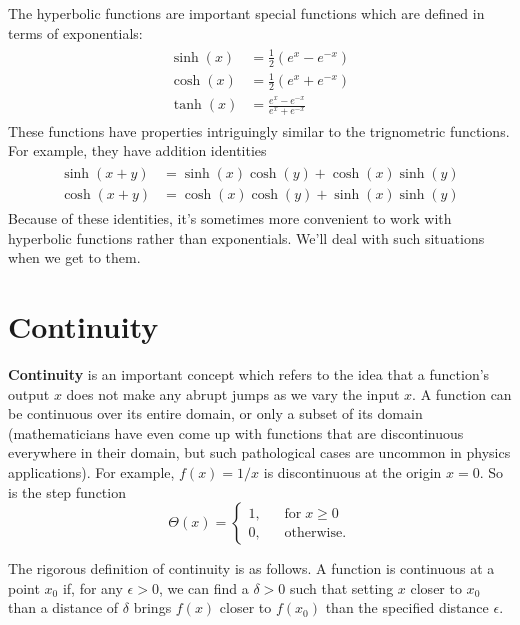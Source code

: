 \documentclass[10pt,a4paper]{article}
\begin{document}
The hyperbolic functions are important special functions which are
defined in terms of exponentials:
\begin{align}
\begin{aligned}\sinh(x) &= \frac{1}{2}\left(e^{x} - e^{-x}\right) \\ \cosh(x) &= \frac{1}{2}\left(e^{x} + e^{-x}\right) \\ \tanh(x) &= \frac{e^{x} - e^{-x}}{e^{x} + e^{-x}}\end{aligned}
\end{align}
These functions have properties intriguingly similar to the trignometric
functions. For example, they have addition identities
\begin{align}
  \begin{aligned}\sinh(x+y) &= \sinh(x)\cosh(y) + \cosh(x)\sinh(y) \\
\cosh(x+y) &= \cosh(x)\cosh(y) + \sinh(x)\sinh(y)\end{aligned}
\end{align}
Because of these identities, it's sometimes more convenient to work with
hyperbolic functions rather than exponentials. We'll deal with such
situations when we get to them.

\section{Continuity}

\textbf{Continuity} is an important concept which refers to the idea
that a function's output $x$ does not make any abrupt jumps as we vary
the input $x$. A function can be continuous over its entire domain, or
only a subset of its domain (mathematicians have even come up with
functions that are discontinuous everywhere in their domain, but such
pathological cases are uncommon in physics applications). For example,
$f(x) = 1/x$ is discontinuous at the origin $x = 0$. So is the step
function
\begin{equation}
\Theta(x) = \left\{\begin{array}{ll} 1, &\;\;\;\textrm{for} \; x \ge 0\\ 0,&\;\;\; \textrm{otherwise.}\end{array}\right.
\end{equation}

The rigorous definition of continuity is as follows. A function is
continuous at a point $x_0$ if, for any $\epsilon > 0$, we can find
a $\delta > 0$ such that setting $x$ closer to $x_0$ than a
distance of $\delta$ brings $f(x)$ closer to $f(x_0)$ than the
specified distance $\epsilon$.
\end{document}
